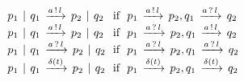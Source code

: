 {
\renewcommand{\Prule}[2]{#1 &~~\Pif~~& #2}
\renewcommand{\Tstep}[3]{\ensuremath{#1 \red{#2} #3}}
\[
\begin{array}{l@{}c@{}l}
\Prule{\Tstep{\Tpar{\Tvar{P_1}}{\Tvar{Q_1}}}{\Tsay{\Tvar{A}}{\Tvar{L}}}{\Tpar{\Tvar{P_2}}{\Tvar{Q_2}}}}{\Tstep{\Tvar{P_1}}{\Tsay{\Tvar{A}}{\Tvar{L}}}{\Tvar{P_2}},\Tstep{\Tvar{Q_1}}{\Thear{\Tvar{A}}{\Tvar{L}}}{\Tvar{Q_2}}}
\\\Prule{\Tstep{\Tpar{\Tvar{P_1}}{\Tvar{Q_1}}}{\Tsay{\Tvar{A}}{\Tvar{L}}}{\Tpar{\Tvar{P_2}}{\Tvar{Q_2}}}}{\Tstep{\Tvar{P_1}}{\Thear{\Tvar{A}}{\Tvar{L}}}{\Tvar{P_2}},\Tstep{\Tvar{Q_1}}{\Tsay{\Tvar{A}}{\Tvar{L}}}{\Tvar{Q_2}}}
\\\Prule{\Tstep{\Tpar{\Tvar{P_1}}{\Tvar{Q_1}}}{\Thear{\Tvar{A}}{\Tvar{L}}}{\Tpar{\Tvar{P_2}}{\Tvar{Q_2}}}}{\Tstep{\Tvar{P_1}}{\Thear{\Tvar{A}}{\Tvar{L}}}{\Tvar{P_2}},\Tstep{\Tvar{Q_1}}{\Thear{\Tvar{A}}{\Tvar{L}}}{\Tvar{Q_2}}}
\\\Prule{\Tstep{\Tpar{\Tvar{P_1}}{\Tvar{Q_1}}}{\Tdelta{\Tvar{T}}}{\Tpar{\Tvar{P_2}}{\Tvar{Q_2}}}}{\Tstep{\Tvar{P_1}}{\Tdelta{\Tvar{T}}}{\Tvar{P_2}},\Tstep{\Tvar{Q_1}}{\Tdelta{\Tvar{T}}}{\Tvar{Q_2}}}
\\\end{array}
\]
}


